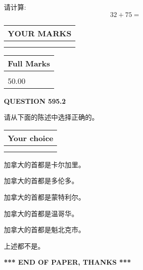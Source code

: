 \documentclass{ctexart}
\begin{document}
  
 
请计算:
\begin{equation}
32 +  %
75 = \nonumber
\end{equation}
 

 

 
  
\vspace{0.2in}
  
\noindent\begin{tabular}{|l|}
\hline
 YOUR MARKS  \\
\hline
 \\ 
 \\ 
\hline
\end{tabular}
\hspace{0.05in} \begin{tabular}{|l|}
\hline
 Full Marks  \\
\hline
 \\ 
50.00 \\
\hline
\end{tabular}
{\textbf{\Large{QUESTION
595.2 
}}}
  
  
请从下面的陈述中选择正确的。
  
  
\noindent\hspace{3.0in} \begin{tabular}{|l|}
\hline
Your choice \\
\hline
 \\ 
 \\ 
\hline
\end{tabular}
  
  
 
 
加拿大的首都是卡尔加里。
 
 
加拿大的首都是多伦多。
 
 
加拿大的首都是蒙特利尔。
 
 
加拿大的首都是温哥华。
 
 
加拿大的首都是魁北克市。
 
 
 上述都不是。
 
 
   
   
 \vspace{0.2in}
 
   
   
   
   
\vspace{1.0in} 
{\textbf{\large{ *** END OF PAPER, THANKS *** }}} 
   
\end{document}
